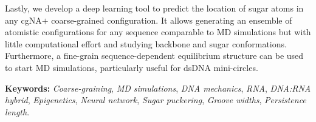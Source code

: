 Lastly, we develop a deep learning tool to predict the location of sugar atoms in any cgNA$+$ coarse-grained configuration. It allows generating an ensemble of atomistic configurations for any sequence comparable to MD simulations but with little computational effort and studying backbone and sugar conformations. Furthermore, a fine-grain sequence-dependent equilibrium structure can be used to start MD simulations, particularly useful for dsDNA mini-circles.

\vskip 0.5cm
\noindent
\textbf{Keywords:} {\it Coarse-graining}, {\it MD simulations}, {\it DNA mechanics}, {\it RNA}, {\it DNA:RNA hybrid}, {\it Epigenetics}, {\it Neural network}, {\it Sugar puckering}, {\it Groove widths}, {\it Persistence length}.




